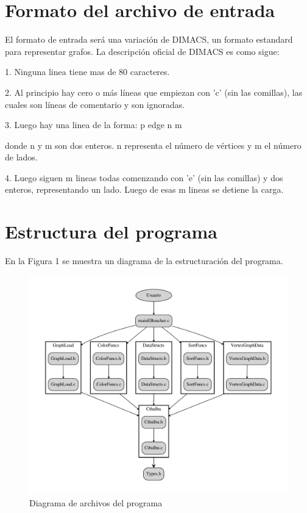 \documentclass[11pt,a4paper]{article}
\theoremstyle{plain}
\begin{document}
\section{Formato del archivo de entrada}
\label{sec:2}

El formato de entrada será una variación de DIMACS, un formato estandard para representar grafos.
La descripción oficial de DIMACS es como sigue:

1. Ninguna linea tiene mas de 80 caracteres.

2. Al principio hay cero o más líneas que empiezan con 'c' (sin las comillas), las cuales son líneas de comentario y son ignoradas.

3. Luego hay una linea de la forma:
p edge n m

donde n y m son dos enteros. n representa el número de vértices y m el número de lados.

4. Luego siguen m lineas todas comenzando con 'e' (sin las comillas) y dos enteros, representando un lado. Luego de esas m lineas se detiene la carga.

\newpage


\section{Estructura del programa}

En la Figura 1 se muestra un diagrama de la estructuración del programa.\\ 

\begin{figure}[htp]
\centering
\includegraphics[scale=0.65]{diagram.pdf}
{\caption{Diagrama de archivos del programa}}
\label{fig:1}
\end{figure}
\end{document}
